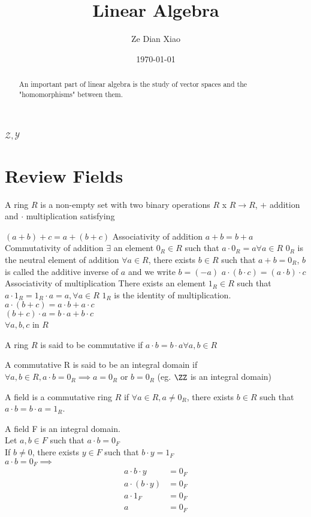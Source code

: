 \documentclass[11pt]{scrartcl}
\title{Linear Algebra}
\date{\today}
\author{Ze Dian Xiao}
\begin{document}
\maketitle
\clearpage
\tableofcontents
\clearpage

\begin{abstract}
	An important part of linear algebra is the study of vector spaces and the "homomorphisms" between them.
\end{abstract}
$\mathscr{Z}, \mathscr{Y}$
\section{Review Fields}
\begin{definition}
	A ring $R$ is a non-empty set with two binary operations $R$ x $R \rightarrow R$, $+$ addition and $\cdot$ multiplication satisfying
	\begin{enumerate}
		\ii
		$(a + b) + c = a + (b + c)$ Associativity of addition
		\ii
		$a + b = b + a$ Commutativity of addition
		\ii
		$\exists$ an element $0_R \in R$ such that $a \cdot 0_R = a \forall a \in R$
		$0_R$ is the neutral element of addition
		\ii
		$\forall a \in R$, there exists $b \in R$ such that $a + b = 0_R$, $b$ is called the additive inverse of $a$ and we write $b = (-a)$
		\ii
		$a \cdot (b \cdot c) = (a \cdot b) \cdot c$ Associativity of multiplication
		\ii
		There exists an element $1_R \in R$ such that $a \cdot 1_R = 1_R \cdot a = a, \forall a \in R$ $1_R$ is the identity of multiplication.
		\ii
		$a \cdot (b + c) = a \cdot b + a\cdot c$\\
		$(b + c ) \cdot a = b\cdot a + b\cdot c$\\
		$\forall a, b, c$ in $R$
	\end{enumerate}
\end{definition}
\begin{definition}
	A ring $R$ is said to be commutative if $a\cdot b = b\cdot a \forall a, b \in R$
\end{definition}
\begin{definition}
	A commutative R is said to be an integral domain if $\forall a,b \in R, a\cdot b = 0_R \implies a = 0_R$ or $b = 0_R$ (eg. $\ZZ$ is an integral domain)
\end{definition}
\begin{definition}
	A field is a commutative ring $R$ if $\forall a \in R, a \neq 0_R$, there exists $b \in R$ such that $ a\cdot b = b\cdot a = 1_R$.
\end{definition}
\begin{definition}
	A field F is an integral domain.\\
	Let $a, b \in F$ such that $a\cdot b = 0_F$\\
	If $b\neq 0$, there exists $y \in F$ such that $b\cdot y = 1_F$\\
	$a\cdot b = 0_F \implies$
	\begin{align*}
		a\cdot b\cdot y &= 0_F\\
		a\cdot(b\cdot y) &= 0_F\\
		a\cdot 1_F &= 0_F\\
		a &= 0_F
	\end{align*}
\end{definition}
\end{document}
